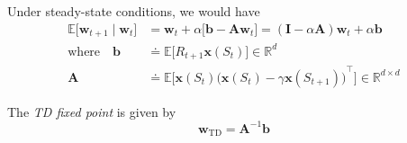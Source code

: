 Under steady-state conditions, we would have
\begin{equation}
    \begin{aligned}
        \mathbb{E} \big[ \mathbf{w}_{t+1} \mid \mathbf{w}_t \big]
         & =
        \mathbf{w}_t + \alpha \big[ \mathbf{b} - \mathbf{A} \mathbf{w}_t \big]
        =
        (\mathbf{I} - \alpha \mathbf{A}) \mathbf{w}_t + \alpha \mathbf{b}
        \\
        \text{where} \quad
        \mathbf{b}
         & \doteq
        \mathbb{E} \Big[ R_{t+1} \mathbf{x}(S_t) \Big] \in \mathbb{R}^d
        \\
        \mathbf{A}
         & \doteq
        \mathbb{E} \Big[ \mathbf{x}(S_t) {\big( \mathbf{x}(S_t) - \gamma \mathbf{x}(S_{t+1}) \big)}^\top \Big] \in \mathbb{R}^{d \times d}
    \end{aligned}
\end{equation}

The \textit{TD fixed point} is given by
\begin{equation}
    \mathbf{w}_\text{TD} = \mathbf{A}^{-1} \mathbf{b}
\end{equation}
